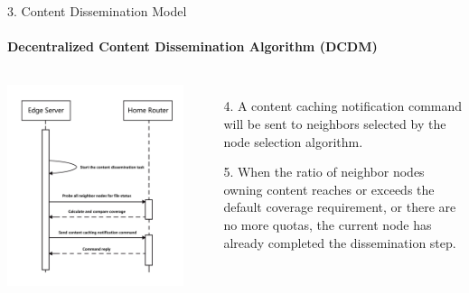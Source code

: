 \documentclass{beamer}		%
\begin{document}
\begin{frame}{3. Content Dissemination Model}
\framesubtitle{Decentralized Content Dissemination Algorithm (DCDM)}
\begin{columns}
\includegraphics[scale=0.08]{Figure1.png}
\begin{enumerate}
    \item[4.] A content caching notification command will be sent to neighbors selected by the node selection algorithm.
    \item[5.] When the ratio of neighbor nodes owning content reaches or exceeds the default coverage requirement, or there are no more quotas, the current node has already completed the dissemination step.
\end{enumerate}
\end{columns}
\end{frame}
\end{document}
